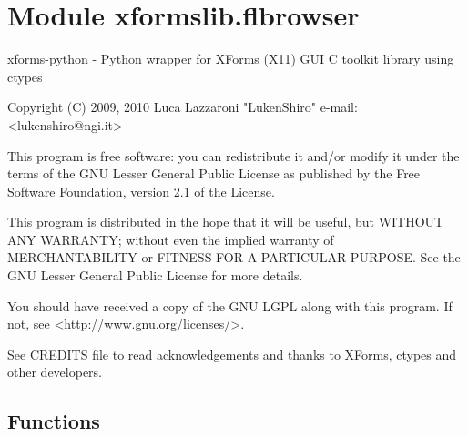 %
%
%


\section{Module xformslib.flbrowser}

    \label{xformslib:flbrowser}
xforms-python - Python wrapper for XForms (X11) GUI C toolkit library using
ctypes

Copyright (C) 2009, 2010  Luca Lazzaroni "LukenShiro" e-mail:  
{\textless}lukenshiro@ngi.it{\textgreater}

This program is free software: you can redistribute it and/or modify it 
under the terms of the GNU Lesser General Public License as published by 
the Free Software Foundation, version 2.1 of the License.

This program is distributed in the hope that it will be useful, but WITHOUT
ANY WARRANTY; without even the implied warranty of MERCHANTABILITY or 
FITNESS FOR A PARTICULAR PURPOSE. See the GNU Lesser General Public License
for more details.

You should have received a copy of the GNU LGPL along with this program. If
not, see {\textless}http://www.gnu.org/licenses/{\textgreater}.

See CREDITS file to read acknowledgements and thanks to XForms, ctypes and 
other developers.



  \subsection{Functions}

    \label{xformslib:flbrowser:fl_add_browser}

